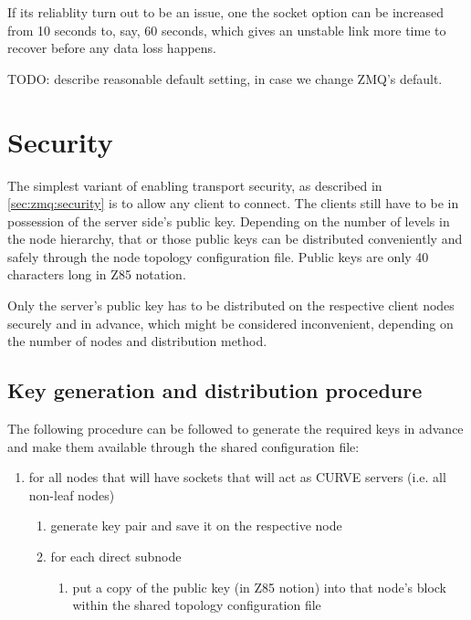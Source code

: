 If its reliablity turn out to be an issue, one the socket option
 can be increased from 10 seconds to, say, 60 seconds, which
gives an unstable link more time to recover before any data loss happens.

TODO: describe reasonable default setting, in case we change ZMQ's default.


\section{Security}\label{sec:approach:security}
The simplest variant of enabling transport security, as described in
\autoref{sec:zmq:security} is to allow any client to connect. The clients still
have to be in possession of the server side's public key. Depending on the
number of levels in the node hierarchy, that or those public keys can be
distributed conveniently and safely through the node topology configuration
file. Public keys are only 40 characters long in \gls{Z85} notation.

Only the server's public key has to be distributed on the respective client nodes
securely and in advance, which might be considered inconvenient, depending on
the number of nodes and distribution method.



\subsection{Key generation and distribution procedure}
The following procedure can be followed to generate the required keys in
advance and make them available through the shared configuration file:

\begin{enumerate}
	\item for all nodes that will have sockets that will act as CURVE servers (i.e. all non-leaf nodes)
	\begin{enumerate}
		\item generate key pair and save it on the respective node
		\item for each direct subnode
		\begin{enumerate}
			\item put a copy of the public key (in Z85 notion) into that node's block within the shared topology configuration file
		\end{enumerate}
	\end{enumerate}
\end{enumerate}

